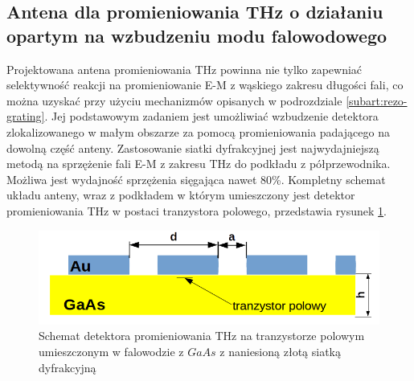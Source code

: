 \subsection{Antena dla promieniowania THz o działaniu opartym na wzbudzeniu modu falowodowego}
\label{subart:antenaThz}
Projektowana antena promieniowania THz powinna nie tylko zapewniać selektywność reakcji na promieniowanie E-M z wąskiego zakresu długości fali, co można uzyskać przy użyciu mechanizmów opisanych w podrozdziale \ref{subart:rezo-grating}. Jej podstawowym zadaniem jest umożliwiać wzbudzenie detektora zlokalizowanego w małym obszarze za pomocą promieniowania padającego na dowolną część anteny. Zastosowanie siatki dyfrakcyjnej jest najwydajniejszą metodą na sprzężenie fali E-M z zakresu THz do podkładu z półprzewodnika. Możliwa jest wydajność sprzężenia sięgająca nawet 80\%\cite{roux2002grating}.  Kompletny schemat układu anteny, wraz z podkładem w którym umieszczony jest detektor promieniowania THz w postaci tranzystora polowego, przedstawia rysunek \ref{fig:schem-podklad-falo}.
\begin{figure}
	\centering
	\includegraphics[width=\textwidth]{images/thz/schemat-podklad-falo.png}
	\caption{Schemat detektora promieniowania THz na tranzystorze polowym umieszczonym w falowodzie z $GaAs$ z naniesioną złotą siatką dyfrakcyjną}
	\label{fig:schem-podklad-falo}
\end{figure}

